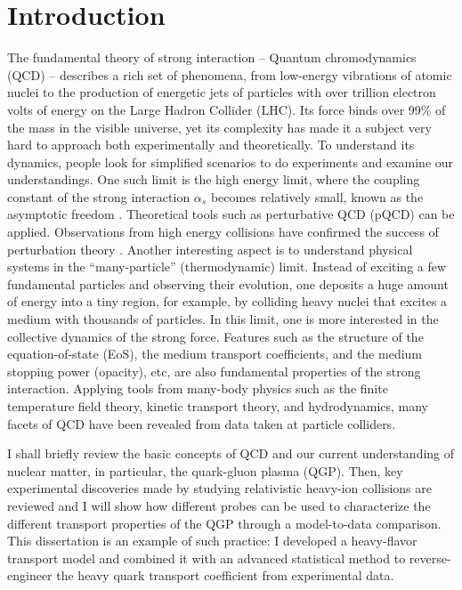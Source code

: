 \chapter{Introduction}
\label{chapter:introduction}
The fundamental theory of strong interaction -- Quantum chromodynamics (QCD) -- describes a rich set of phenomena, from low-energy vibrations of atomic nuclei to the production of energetic jets of particles with over trillion electron volts of energy on the Large Hadron Collider (LHC).
Its force binds over 99\% of the mass in the visible universe, yet its complexity has made it a subject very hard to approach both experimentally and theoretically.
To understand its dynamics, people look for simplified scenarios to do experiments and examine our understandings.
One such limit is the high energy limit, where the coupling constant of the strong interaction $\alpha_s$ becomes relatively small, known as the asymptotic freedom \cite{Gross:1973id,Politzer:1973fx}. 
Theoretical tools such as perturbative QCD (pQCD) can be applied.
Observations from high energy collisions have confirmed the success of perturbation theory \cite{RevModPhys.59.465}.
Another interesting aspect is to understand physical systems in the ``many-particle'' (thermodynamic) limit.
Instead of exciting a few fundamental particles and observing their evolution, one deposits a huge amount of energy into a tiny region, for example, by colliding heavy nuclei that excites a medium with thousands of particles. 
In this limit, one is more interested in the collective dynamics of the strong force.
Features such as the structure of the equation-of-state (EoS), the medium transport coefficients, and the medium stopping power (opacity), etc, are also fundamental properties of the strong interaction.
Applying tools from many-body physics such as the finite temperature field theory, kinetic transport theory, and hydrodynamics, many facets of QCD have been revealed from data taken at particle colliders.

I shall briefly review the basic concepts of QCD and our current understanding of nuclear matter, in particular, the quark-gluon plasma (QGP). 
Then, key experimental discoveries made by studying relativistic heavy-ion collisions are reviewed and I will show how different probes can be used to characterize the different transport properties of the QGP through a model-to-data comparison.
This dissertation is an example of such practice: I developed a heavy-flavor transport model and combined it with an advanced statistical method to reverse-engineer the heavy quark transport coefficient from experimental data.

